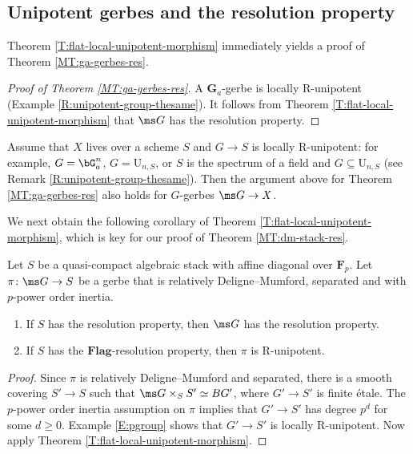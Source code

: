\documentclass[reqno,a4paper]{amsart}
\numberwithin{Theorem}{section}
\renewcommand{\U}{\mathrm{U}}
\newcommand{\Flag}{\mathbf{Flag}}
\theoremstyle{plain}
\theoremstyle{remark}
\newcommand{\classB}{B}
\begin{document}
\subsection{Unipotent gerbes and the resolution property}
Theorem
\ref{T:flat-local-unipotent-morphism} immediately yields a proof of Theorem \ref{MT:ga-gerbes-res}.
\begin{proof}[Proof of Theorem \ref{MT:ga-gerbes-res}]
  A $\mathbf{G}_a$-gerbe is locally R-unipotent (Example
  \ref{R:unipotent-group-thesame}). It follows from Theorem
  \ref{T:flat-local-unipotent-morphism} that $\ms G$ has the resolution
  property.
\end{proof}

\begin{remark} \label{rem:extendingA} Assume that $X$ lives over a
  scheme $S$ and $G \to S$ is locally R-unipotent: for example, $G=\bG_a^n$, $G=\U_{n,S}$, or $S$ is the spectrum of a field and $G \subseteq \U_{n,S}$ (see Remark \ref{R:unipotent-group-thesame}). Then the argument above for Theorem
  \ref{MT:ga-gerbes-res} also holds for $G$-gerbes $\ms G \to X$.
\end{remark}

We next obtain the following
corollary of Theorem \ref{T:flat-local-unipotent-morphism}, which is
key for our proof of Theorem \ref{MT:dm-stack-res}.
\begin{corollary}\label{C:rel-DM-p-power}
  Let $S$ be a quasi-compact algebraic stack with affine diagonal over $\mathbf{F}_p$. Let $\pi \colon \ms G \to S$ be a
  gerbe that is relatively Deligne--Mumford, separated and with
  $p$-power order inertia.
  \begin{enumerate}
  \item If $S$ has the resolution property, then $\ms G$ has the resolution property. 
  \item If $S$ has the $\Flag$-resolution property, then $\pi$ is R-unipotent. 
\end{enumerate}

\end{corollary}
\begin{proof}
  Since $\pi$ is relatively Deligne--Mumford and separated, there is a
  smooth covering $S'\to S$ such that
  $\ms G\times_S S' \simeq \classB G'$, where $G' \to S'$ is finite
  \'etale. The $p$-power order inertia assumption on $\pi$ implies
  that $G' \to S'$ has degree $p^d$ for some $d\geq 0$. Example
  \ref{E:pgroup} shows that $G' \to S'$ is locally R-unipotent. Now
  apply Theorem \ref{T:flat-local-unipotent-morphism}.
\end{proof}
\end{document}
